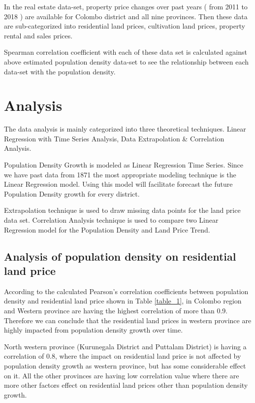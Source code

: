 \documentclass[conference]{IEEEtran}
\begin{document}
In the real estate data-set, property price changes over past years ( from 2011 to 2018 ) are available for Colombo district and all nine provinces. Then these data are sub-categorized into residential land prices, cultivation land prices, property rental and sales prices.

Spearman correlation coefficient with each of these data set is calculated against above estimated population density  data-set to see the relationship between each data-set with the population density. 


\section{Analysis}

The data analysis is mainly categorized into three theoretical techniques. Linear Regression with Time Series Analysis, Data Extrapolation & Correlation Analysis. 

Population Density Growth is modeled as Linear Regression Time Series. Since we have past data from 1871 the most appropriate modeling technique is the Linear Regression model. Using this model will facilitate forecast the future Population Density growth for every district.

Extrapolation technique is used to draw missing data points for the land price data set.
Correlation Analysis technique is used to compare two Linear Regression model for the Population Density and Land Price Trend.


\subsection{Analysis of population density on residential land price}

According to the calculated Pearson’s correlation coefficients between population density and residential land price shown in Table \ref{table_1}, in Colombo region and Western province are having the highest correlation of more than 0.9. Therefore we can conclude that the residential land prices in western province are highly impacted from population density growth over time. 

North western province (Kurunegala District and Puttalam District) is having a correlation of 0.8, where the impact on residential land price is not affected by population density growth as western province, but has some considerable effect on it. All the other provinces are having low correlation value where there are more other factors effect on residential land prices other than population density growth. 
\end{document}
